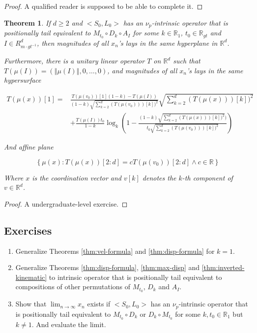 \documentclass{book}
\newtheorem{theorem}{Theorem}
\theoremstyle{definition}\newtheorem{mechanism}{Mechanism}
\theoremstyle{remark}\newtheorem*{remark}{Remark}
\begin{document}
\begin{proof}
	A qualified reader is supposed to be able to complete it.
\end{proof}

\begin{theorem}\label{thm:trace-theorem}
	If $d\ge 2$ and $<S_0, L_0>$ has an $\nu_p$-intrinsic operator that is positionally tail equivalent to $M_{t_0} \circ D_k \circ A_I$ for some $k\in \mathbb R_1$, $t_0 \in \mathbb R_{gt}$ and $I\in R_{m\cdot gt^{-1}}^d$, then magnitudes of all $x_n$'s lays in the same hyperplane in $\mathbb R^d$.
	
	Furthermore, there is a unitary linear operator $T$ on $\mathbb R^d$ such that $T(\mu(I)) = \left(\left\Vert \mu(I)\right\Vert, 0, \dots, 0\right)$, and magnitudes of all $x_n$'s lays in the same hypersurface
	
	\begin{align*}
		T(\mu(x))[1] =& \frac{T(\mu(v_0))[1](1 - k) - T(\mu(I))}{(1 - k)\sqrt{\sum_{k = 2}^d (T(\mu(v_0)))[k])^2}} \sqrt{\sum_{k = 2}^d (T(\mu(x)))[k])^2} \\
		&+ \frac{T(\mu(I))t_0}{1 - k}\log_k\left(1 - \frac{(1 - k)\sqrt{\sum_{k = 2}^d (T(\mu(x)))[k])^2})}{t_0\sqrt{\sum_{k = 2}^d (T(\mu(v_0)))[k])^2}}\right)
	\end{align*}
	
	And affine plane
	
	\begin{equation*}
		\left\{\mu(x) : T(\mu(x))[2:d] = cT(\mu(v_0))[2:d]\land c\in \mathbb R\right\}
	\end{equation*}
	
	Where $x$ is the coordination vector and $v[k]$ denotes the $k$-th component of $v\in \mathbb R^d$.
\end{theorem}

\begin{proof}
	A undergraduate-level exercise.
\end{proof}

\subsection*{Exercises}

\begin{enumerate}
	\item Generalize Theorems \ref{thm:vel-formula} and \ref{thm:disp-formula} for $k = 1$.
	\item Generalize Theorems \ref{thm:disp-formula}, \ref{thm:max-disp} and \ref{thm:inverted-kinematic} to intrinsic operator that is positionally tail equivalent to compositions of other permutations of $M_{t_0}$, $D_k$ and $A_I$.
	\item Show that $\lim_{n\to \infty} x_n$ exists if $<S_0, L_0>$ has an $\nu_p$-intrinsic operator that is positionally tail equivalent to $M_{t_0} \circ D_k$ or $D_k \circ M_{t_0}$ for some $k, t_0\in \mathbb R_1$ but $k\ne 1$. And evaluate the limit.
\end{enumerate}
\end{document}
